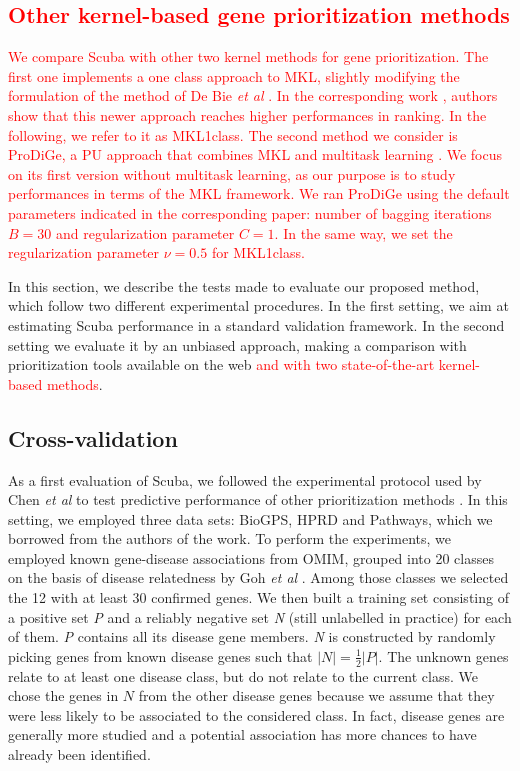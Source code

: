 \textcolor{red}{\subsection*{Other kernel-based gene prioritization methods}
We compare Scuba with other two kernel methods for gene prioritization. The first one implements a one class approach to MKL, slightly modifying the formulation of the method of De Bie \emph{et al} \cite{debie}. In the corresponding work \cite{mkl1class}, authors show that this newer approach reaches higher performances in ranking. In the following, we refer to it as MKL1class. The second method we consider is ProDiGe, a PU approach that combines MKL and multitask learning \cite{prodige}. We focus on its first version without multitask learning, as our purpose is to study performances in terms of the MKL framework. We ran ProDiGe using the default parameters indicated in the corresponding paper: number of bagging iterations $B=30$ and regularization parameter $C=1$. In the same way, we set the regularization parameter $\nu=0.5$ for MKL1class.}

In this section, we describe the tests made to evaluate our proposed method, which follow two different experimental procedures. In the first setting, we aim at estimating Scuba performance in a standard validation framework. In the second setting we evaluate it by an unbiased approach, making a comparison with prioritization tools available on the web \textcolor{red}{and with two state-of-the-art kernel-based methods}.

\subsection*{Cross-validation}
As a first evaluation of Scuba, we followed the experimental protocol used by Chen \emph{et al} to test predictive performance of other prioritization methods \cite{f3pc}. In this setting, we employed three data sets: BioGPS, HPRD and Pathways, which we borrowed from the authors of the work. To perform the experiments, we employed known gene-disease associations from OMIM, grouped into 20 classes on the basis of disease relatedness by Goh \emph{et al} \cite{goh}. Among those classes we selected the 12 with at least 30 confirmed genes. We then built a training set consisting of a positive set \textit{P} and a reliably negative set \textit{N} (still unlabelled in practice) for each of them. \textit{P} contains all its disease gene members. \textit{N} is constructed by randomly picking genes from known disease genes such that $\vert N \vert = \frac{1}{2} \vert P \vert$. The unknown genes relate to at least one disease class, but do not relate to the current class. We chose the genes in $N$ from the other disease genes because we assume that they were less likely to be associated to the considered class. In fact, disease genes are generally more studied and a potential association has more chances to have already been identified.


